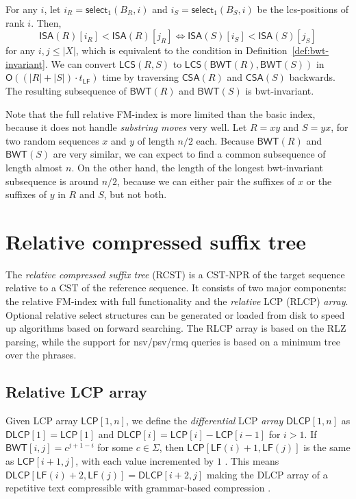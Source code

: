 \documentclass[a4paper,11pt]{llncs}
\newcommand{\abs}[1]{\ensuremath{\lvert #1 \rvert}}
\newcommand{\CST}{\textsf{CST}}
\newcommand{\CSTnpr}{\textsf{CST\nobreakdash-NPR}}
\newcommand{\RCST}{\textsf{RCST}}
\newcommand{\mISA}{\ensuremath{\mathsf{ISA}}}
\newcommand{\mBWT}{\ensuremath{\mathsf{BWT}}}
\newcommand{\mCSA}{\ensuremath{\mathsf{CSA}}}
\newcommand{\LCP}{\textsf{LCP}}
\newcommand{\DLCP}{\textsf{DLCP}}
\newcommand{\RLCP}{\textsf{RLCP}}
\newcommand{\mLCP}{\ensuremath{\mathsf{LCP}}}
\newcommand{\mDLCP}{\ensuremath{\mathsf{DLCP}}}
\newcommand{\RLZ}{\textsf{RLZ}}
\newcommand{\mLCS}{\ensuremath{\mathsf{LCS}}}
\newcommand{\nsv}{\textsf{nsv}}
\newcommand{\psv}{\textsf{psv}}
\newcommand{\rmq}{\textsf{rmq}}
\newcommand{\mLF}{\ensuremath{\mathsf{LF}}}
\newcommand{\mselect}{\ensuremath{\mathsf{select}}}
\newcommand{\Oh}{\ensuremath{\mathsf{O}}}
\begin{document}
For any $i$, let $i_{R} = \mselect_{1}(B_{R}, i)$ and $i_{S} = \mselect_{1}(B_{S}, i)$ be the lcs-positions of rank $i$. Then,
$$
\mISA(R)[i_{R}] < \mISA(R)[j_{R}] \iff \mISA(S)[i_{S}] < \mISA(S)[j_{S}]
$$
for any $i,j \le \abs{X}$, which is equivalent to the condition in Definition~\ref{def:bwt-invariant}. We can convert $\mLCS(R,S)$ to $\mLCS(\mBWT(R),\mBWT(S))$ in $\Oh((\abs{R}+\abs{S}) \cdot t_{\mLF})$ time by traversing $\mCSA(R)$ and $\mCSA(S)$ backwards. The resulting subsequence of $\mBWT(R)$ and $\mBWT(S)$ is bwt-invariant.

Note that the full relative FM-index is more limited than the basic index, because it does not handle \emph{substring moves} very well. Let $R = xy$ and $S = yx$, for two random sequences $x$ and $y$ of length $n/2$ each. Because $\mBWT(R)$ and $\mBWT(S)$ are very similar, we can expect to find a common subsequence of length almost $n$. On the other hand, the length of the longest bwt-invariant subsequence is around $n/2$, because we can either pair the suffixes of $x$ or the suffixes of $y$ in $R$ and $S$, but not both.


\section{Relative compressed suffix tree}

The \emph{relative compressed suffix tree} (\RCST) is a \CSTnpr{} of the target sequence relative to a \CST{} of the reference sequence. It consists of two major components: the relative FM-index with full functionality and the \emph{relative} \LCP{} (\RLCP) \emph{array}. Optional relative select structures can be generated or loaded from disk to speed up algorithms based on forward searching. The \RLCP{} array is based on the \RLZ{} parsing, while the support for \nsv/\psv/\rmq{} queries is based on a minimum tree over the phrases.

\subsection{Relative \LCP{} array}

Given \LCP{} array $\mLCP[1,n]$, we define the \emph{differential} \LCP{} \emph{array} $\mDLCP[1,n]$ as $\mDLCP[1] = \mLCP[1]$ and $\mDLCP[i] = \mLCP[i] - \mLCP[i-1]$ for $i > 1$. If $\mBWT[i,j] = c^{j+1-i}$ for some $c \in \Sigma$, then $\mLCP[\mLF(i)+1,\mLF(j)]$ is the same as $\mLCP[i+1,j]$, with each value incremented by $1$ \cite{Fischer2009a}. This means $\mDLCP[\mLF(i)+2,\mLF(j)] = \mDLCP[i+2,j]$ making the \DLCP{} array of a repetitive text compressible with grammar-based compression \cite{Abeliuk2013}.
\end{document}
